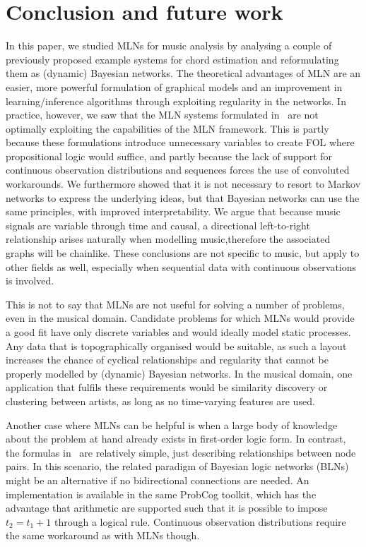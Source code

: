 \documentclass[letterpaper]{article} %
\begin{document}
\section{Conclusion and future work}
In this paper, we studied MLNs for music analysis by analysing a couple of previously proposed example systems for chord estimation and reformulating them as (dynamic) Bayesian networks. The theoretical advantages of MLN are an easier, more powerful formulation of graphical models and an improvement in learning/inference algorithms through exploiting regularity in the networks. In practice, however, we saw that the MLN systems formulated in~\cite{papadopoulos2012ismir,papadopoulos2013icassp,papadopoulos2017taslp} are not optimally exploiting the capabilities of the MLN framework. This is partly because these formulations introduce unnecessary variables to create FOL where propositional logic would suffice, and partly because the lack of support for continuous observation distributions and sequences forces the use of convoluted workarounds. We furthermore showed that it is not necessary to resort to Markov networks to express the underlying ideas, but that Bayesian networks can use the same principles, with improved interpretability. We argue that because music signals are variable through time and causal, a directional left-to-right relationship arises naturally when modelling music,therefore the associated graphs will be chainlike. These conclusions are not specific to music, but apply to other fields as well, especially when sequential data with continuous observations is involved.

This is not to say that MLNs are not useful for solving a number of problems, even in the musical domain. Candidate problems for which MLNs would provide a good fit have only discrete variables and would ideally model static processes. Any data that is topographically organised would be suitable, as such a layout increases the chance of cyclical relationships and regularity that cannot be properly modelled by (dynamic) Bayesian networks. In the musical domain, one application that fulfils these requirements would be similarity discovery or clustering between artists, as long as no time-varying features are used.

Another case where MLNs can be helpful is when a large body of knowledge about the problem at hand already exists in first-order logic form. In contrast, the formulas in~\cite{papadopoulos2012ismir,papadopoulos2013icassp,papadopoulos2017taslp} are relatively simple, just describing relationships between node pairs. In this scenario, the related paradigm of Bayesian logic networks (BLNs)~\cite{jain2009tr} might be an alternative if no bidirectional connections are needed. An implementation is available in the same ProbCog toolkit, which has the advantage that arithmetic are supported such that it is possible to impose $t_2=t_1+1$ through a logical rule. Continuous observation distributions require the same workaround as with MLNs though.
\end{document}
